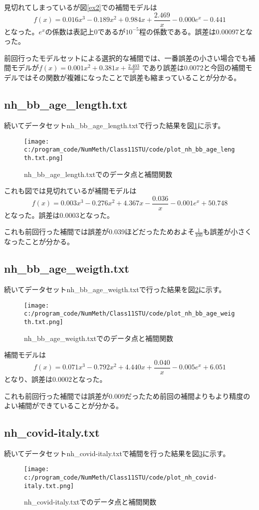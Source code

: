 \documentclass[a4paper,11pt,dvipdfmx]{jsarticle}
\begin{document}
見切れてしまっているが図\ref{ex2}での補間モデルは\[f(x)=0.016x^3 -0.189x^2 + 0.984x + \frac{2.469}{x} -0.000e^x -0.441\]
となった。$e^x$の係数は表記上0であるが$10^{-5}$程の係数である。誤差は0.00097となった。

前回行ったモデルセットによる選択的な補間では、一番誤差の小さい場合でも補間モデルが$f(x)=0.001x^2+0.381x+\frac{2.403}{x}$
であり誤差は0.0072と今回の補間モデルではその関数が複雑になったことで誤差も縮まっていることが分かる。

\subsection{nh\_bb\_age\_length.txt}
続いてデータセットnh\_bb\_age\_length.txtで行った結果を図\ref{len}に示す。
\begin{figure}[h]
\centering
\texttt{[image: c:/program\_code/NumMeth/Class11STU/code/plot\_nh\_bb\_age\_length.txt.png]}
\caption{nh\_bb\_age\_length.txtでのデータ点と補間関数}
\label{len}
\end{figure}

これも図では見切れているが補間モデルは
\[f(x)=0.003x^3 -0.276x^2 + 4.367x - \frac{0.036}{x} -0.001e^x + 50.748\]
となった。誤差は0.0003となった。

これも前回行った補間では誤差が0.039ほどだったためおよそ$\frac{1}{100}$も誤差が小さくなったことが分かる。

\subsection{nh\_bb\_age\_weigth.txt}
続いてデータセットnh\_bb\_age\_weigth.txtで行った結果を図\ref{wgh}に示す。
\begin{figure}[h]
\centering
\texttt{[image: c:/program\_code/NumMeth/Class11STU/code/plot\_nh\_bb\_age\_weigth.txt.png]}
\caption{nh\_bb\_age\_weigth.txtでのデータ点と補間関数}
\label{wgh}
\end{figure}

補間モデルは
\[f(x)= 0.071x^3 - 0.792x^2 + 4.440x + \frac{0.040}{x} - 0.005e^x+ 6.051\]
となり、誤差は0.0002となった。

これも前回行った補間では誤差が0.009だったため前回の補間よりもより精度のよい補間ができていることが分かる。

\subsection{nh\_covid-italy.txt}
続いてデータセットnh\_covid-italy.txtで補間を行った結果を図\ref{cov}に示す。
\begin{figure}[h]
\centering
\texttt{[image: c:/program\_code/NumMeth/Class11STU/code/plot\_nh\_covid-italy.txt.png]}
\caption{nh\_covid-italy.txtでのデータ点と補間関数}
\label{cov}
\end{figure}
\end{document}
